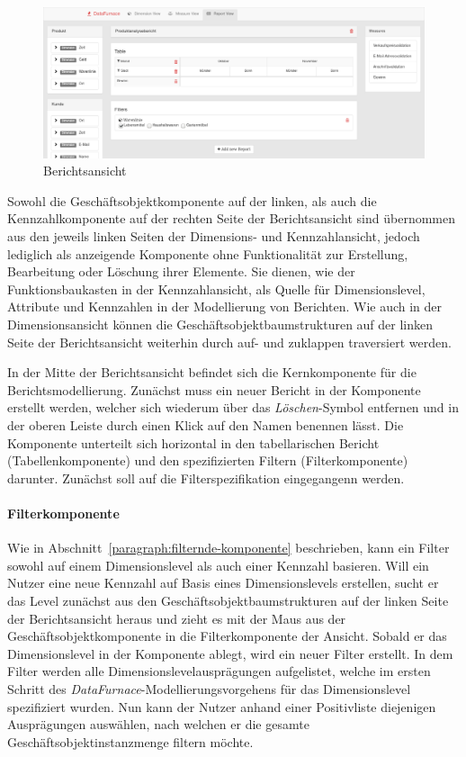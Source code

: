 \documentclass[
  language=german, %
  type=bachelor,%
  ngerman
]{isthesis}
\begin{document}
\begin{content}
  \begin{figure}
    \includegraphics[scale=0.29]{content/figures/report-view.png}
    \caption{Berichtsansicht}\label{berichtsansicht}
  \end{figure}

  Sowohl die Geschäftsobjektkomponente auf der linken, als auch die
  Kennzahlkomponente auf der rechten Seite der Berichtsansicht sind übernommen
  aus den jeweils linken Seiten der Dimensions- und Kennzahlansicht, jedoch
  lediglich als anzeigende Komponente ohne Funktionalität zur Erstellung,
  Bearbeitung oder Löschung ihrer Elemente. Sie dienen, wie der
  Funktionsbaukasten in der Kennzahlansicht, als Quelle für Dimensionslevel,
  Attribute und Kennzahlen in der Modellierung von Berichten. Wie auch in der
  Dimensionsansicht können die Geschäftsobjektbaumstrukturen auf der linken
  Seite der Berichtsansicht weiterhin durch auf- und zuklappen traversiert
  werden.

  In der Mitte der Berichtsansicht befindet sich die Kernkomponente für die
  Berichtsmodellierung. Zunächst muss ein neuer Bericht
  in der Komponente erstellt werden, welcher sich wiederum über das
  \textit{Löschen}-Symbol entfernen und in der oberen Leiste durch einen Klick
  auf den Namen benennen lässt. Die Komponente unterteilt sich horizontal in
  den tabellarischen Bericht (Tabellenkomponente) und den spezifizierten
  Filtern (Filterkomponente) darunter. Zunächst soll auf die
  Filterspezifikation eingegangenn werden. 
  
  \paragraph{Filterkomponente}
  
  Wie in Abschnitt~\ref{paragraph:filternde-komponente}
  beschrieben, kann ein Filter sowohl auf einem Dimensionslevel als auch einer
  Kennzahl basieren. Will ein Nutzer eine neue Kennzahl auf Basis eines
  Dimensionslevels erstellen, sucht er das Level zunächst aus den
  Geschäftsobjektbaumstrukturen auf der linken Seite der Berichtsansicht heraus
  und zieht es mit der Maus aus der Geschäftsobjektkomponente in die
  Filterkomponente der Ansicht. Sobald er das Dimensionslevel in der Komponente
  ablegt, wird ein neuer Filter erstellt. In dem Filter werden alle
  Dimensionslevelausprägungen aufgelistet, welche im ersten Schritt des
  \textit{DataFurnace}-Modellierungsvorgehens für das Dimensionslevel
  spezifiziert wurden. Nun kann der Nutzer anhand einer Positivliste
  diejenigen Ausprägungen auswählen, nach welchen er die gesamte
  Geschäftsobjektinstanzmenge filtern möchte.


\end{content}
\end{document}
